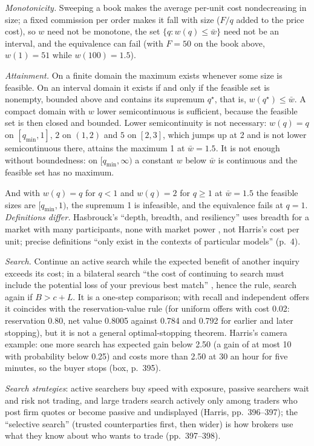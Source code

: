 \begin{qfdefinition}
\emph{Monotonicity.} Sweeping a book makes the average per-unit cost nondecreasing in size; a fixed commission per order makes it fall with size ($F/q$ added to the price cost), so $w$ need not be monotone, the set $\{q:w(q)\le\bar w\}$ need not be an interval, and the equivalence can fail (with $F=50$ on the book above, $w(1)=51$ while $w(100)=1.5$).

\emph{Attainment.} On a finite domain the maximum exists whenever some size is feasible. On an interval domain it exists if and only if the feasible set is nonempty, bounded above and contains its supremum $q^\star$, that is, $w(q^\star)\le\bar w$. A compact domain with $w$ lower semicontinuous is sufficient, because the feasible set is then closed and bounded. Lower semicontinuity is not necessary: $w(q)=q$ on $[q_{\min},1]$, $2$ on $(1,2)$ and $5$ on $[2,3]$, which jumps up at 2 and is not lower semicontinuous there, attains the maximum 1 at $\bar w=1.5$. It is not enough without boundedness: on $[q_{\min},\infty)$ a constant $w$ below $\bar w$ is continuous and the feasible set has no maximum.

And with $w(q)=q$ for $q<1$ and $w(q)=2$ for $q\ge1$ at $\bar w=1.5$ the feasible sizes are $[q_{\min},1)$, the supremum 1 is infeasible, and the equivalence fails at $q=1$. \emph{Definitions differ.} Hasbrouck's ``depth, breadth, and resiliency'' uses breadth for a market with many participants, none with market power \citep[chap.~1, sec.~1.2, pp.~4--5]{s6-hasbrouck}, not Harris's cost per unit; precise definitions ``only exist in the contexts of particular models'' (p.~4).

\emph{Search.} Continue an active search while the expected benefit of another inquiry exceeds its cost; in a bilateral search ``the cost of continuing to search must include the potential loss of your previous best match'' \citep[chap.~19, secs.~19.1.1--19.1.2, pp.~395--396]{alpha-harris}, hence the rule, search again if $B>c+L$. It is a one-step comparison; with recall and independent offers it coincides with the reservation-value rule (for uniform offers with cost 0.02: reservation 0.80, net value 0.8005 against 0.784 and 0.792 for earlier and later stopping), but it is not a general optimal-stopping theorem. Harris's camera example: one more search has expected gain below 2.50 (a gain of at most 10 with probability below 0.25) and costs more than 2.50 at 30 an hour for five minutes, so the buyer stops (box, p.~395).

 \emph{Search strategies}: active searchers buy speed with exposure, passive searchers wait and risk not trading, and large traders search actively only among traders who post firm quotes or become passive and undisplayed (Harris, pp.~396--397); the ``selective search'' (trusted counterparties first, then wider) is how brokers use what they know about who wants to trade (pp.~397--398).


\end{qfdefinition}
